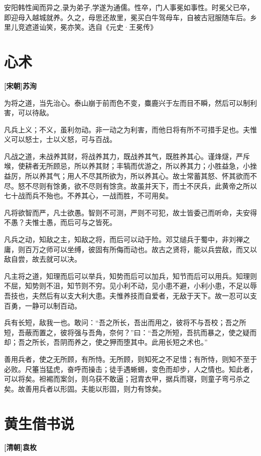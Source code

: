 \documentclass[UTF8,titlepage,oneside]{ctexbook}
\begin{document}
安阳韩性闻而异之,录为弟子,学遂为通儒。性卒，门人事冕如事性。时冕父已卒，即迎母入越城就养。久之，母思还故里，冕买白牛驾母车，自被古冠服随车后。乡里儿竞遮道讪笑，冕亦笑。选自《元史·王冕传》



\chapter*{心术}
\begin{center}
	\textbf{[宋朝]苏洵}
\end{center}


为将之道，当先治心。泰山崩于前而色不变，麋鹿兴于左而目不瞬，然后可以制利害，可以待敌。


凡兵上义；不义，虽利勿动。非一动之为利害，而他日将有所不可措手足也。夫惟义可以怒士，士以义怒，可与百战。


凡战之道，未战养其财，将战养其力，既战养其气，既胜养其心。谨烽燧，严斥堠，使耕者无所顾忌，所以养其财；丰犒而优游之，所以养其力；小胜益急，小挫益厉，所以养其气；用人不尽其所欲为，所以养其心。故士常蓄其怒、怀其欲而不尽。怒不尽则有馀勇，欲不尽则有馀贪。故虽并天下，而士不厌兵，此黄帝之所以七十战而兵不殆也。不养其心，一战而胜，不可用矣。


凡将欲智而严，凡士欲愚。智则不可测，严则不可犯，故士皆委己而听命，夫安得不愚？夫惟士愚，而后可与之皆死。


凡兵之动，知敌之主，知敌之将，而后可以动于险。邓艾缒兵于蜀中，非刘禅之庸，则百万之师可以坐缚，彼固有所侮而动也。故古之贤将，能以兵尝敌，而又以敌自尝，故去就可以决。


凡主将之道，知理而后可以举兵，知势而后可以加兵，知节而后可以用兵。知理则不屈，知势则不沮，知节则不穷。见小利不动，见小患不避，小利小患，不足以辱吾技也，夫然后有以支大利大患。夫惟养技而自爱者，无敌于天下。故一忍可以支百勇，一静可以制百动。


兵有长短，敌我一也。敢问：“吾之所长，吾出而用之，彼将不与吾校；吾之所短，吾蔽而置之，彼将强与吾角，奈何？”曰：“吾之所短，吾抗而暴之，使之疑而却；吾之所长，吾阴而养之，使之狎而堕其中。此用长短之术也。”


善用兵者，使之无所顾，有所恃。无所顾，则知死之不足惜；有所恃，则知不至于必败。尺箠当猛虎，奋呼而操击；徒手遇蜥蜴，变色而却步，人之情也。知此者，可以将矣。袒裼而案剑，则乌获不敢逼；冠胄衣甲，据兵而寝，则童子弯弓杀之矣。故善用兵者以形固。夫能以形固，则力有馀矣。



\chapter*{黄生借书说}
\begin{center}
	\textbf{[清朝]袁枚}
\end{center}
\end{document}
